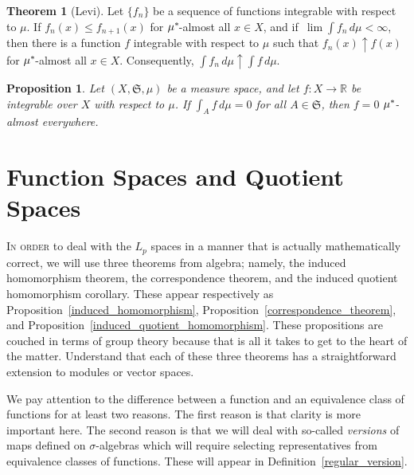 \documentclass[
twoside=true,
paper=letter,
fontsize=9pt,
pagesize=auto,
leqno,
openany,
headsepline,
overfullrule,
]{scrbook}
\theoremstyle{plain}
\theoremstyle{plain}
\newtheorem{prop}[thm]{Proposition}
\theoremstyle{definition}
\theoremstyle{bfnoteitalic}
\newtheorem{thmboldnote}[thm]{Theorem}
\theoremstyle{bfnoteroman}
\newcommand{\sigalg}[1]{\mathfrak{#1}}
\newcommand{\textsigma}{\hbox{\large{$\sigma$}}\kern-1pt}
\newcommand{\R}{\mathbb{R}}
\newcommand{\semiring}{\sigalg{S}}
\newcommand{\kernast}{\ast\kern-1pt}
\newcommand{\funcf}{f}
\newcommand{\measurespace}{X}
\newcommand{\measure}{\mu}
\newcommand{\measmu}{\mu}
\newcommand{\seti}{A}
\begin{document}
\begin{thmboldnote}[Levi]\label{levi}
Let $\{ \funcf_n \}$ be a sequence of functions integrable with respect to $\measmu$.
If $\funcf_n(x) \leq \funcf_{n+1}(x)$ for
$\measmu^\kernast$\hyp{}almost all $x\in\measurespace$,
and if\, $\lim \int \funcf_n \, d\measmu < \infty$,
then there is a function
$\funcf$ integrable with respect to $\measmu$ such that
$\funcf_n(x) \uparrow \funcf(x)$ for
$\measmu^\kernast$\hyp{}almost all
$x\in\measurespace$.  Consequently,
$\int \funcf_n\, d\measmu
\uparrow
\int \funcf \, d\measmu$.
\end{thmboldnote}




\begin{prop}\label{uniqueness_radon_nikodym}
Let
$(\measurespace,\semiring,\measure)$
be a measure space, and let $\funcf:\measurespace\to\R$ be integrable over
$\measurespace$
with respect to $\measure$.
If
$\int_\seti f\, d\measmu = 0$ for all $\seti\in\semiring$, then
$f = 0$ $\measure^\kernast$\hyp{}almost everywhere.
\end{prop}



\chapter{Function Spaces and Quotient Spaces}
\lettrine{I}{n order} to deal with the $L_p$ spaces in a manner that is actually mathematically correct, 
we will use three theorems from algebra; namely, 
the induced homomorphism theorem, the correspondence theorem, and the induced quotient homomorphism corollary. These appear respectively as Proposition~\ref{induced_homomorphism}, Proposition~\ref{correspondence_theorem}, and Proposition~\ref{induced_quotient_homomorphism}. These propositions are couched in terms of group theory because that is all it takes to get to the heart of the matter. Understand that each of these three theorems has a straightforward extension to modules or vector spaces.

We pay attention to the difference between a function and an equivalence class of functions for at least two reasons.  The first reason is that  clarity is more important here.  The second reason is that we will deal with so-called \emph{versions} of maps defined on \textsigma-algebras which will require selecting representatives from equivalence classes of functions. These will appear in Definition~\ref{regular_version}.
\end{document}
